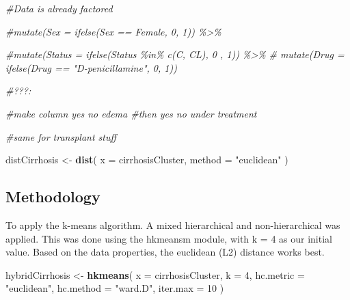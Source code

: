 \documentclass[
]{article}
\newenvironment{Shaded}{\begin{snugshade}}{\end{snugshade}}
\newcommand{\AttributeTok}[1]{\textcolor[rgb]{0.13,0.29,0.53}{#1}}
\newcommand{\CommentTok}[1]{\textcolor[rgb]{0.56,0.35,0.01}{\textit{#1}}}
\newcommand{\DecValTok}[1]{\textcolor[rgb]{0.00,0.00,0.81}{#1}}
\newcommand{\FunctionTok}[1]{\textcolor[rgb]{0.13,0.29,0.53}{\textbf{#1}}}
\newcommand{\NormalTok}[1]{#1}
\newcommand{\OtherTok}[1]{\textcolor[rgb]{0.56,0.35,0.01}{#1}}
\newcommand{\StringTok}[1]{\textcolor[rgb]{0.31,0.60,0.02}{#1}}
\begin{document}
\begin{Shaded}
\begin{Highlighting}[]
                                    
                          

\CommentTok{\#Data is already factored}
     
\CommentTok{\#mutate(Sex = ifelse(Sex == \textquotesingle{}Female\textquotesingle{}, 0, 1)) \%\textgreater{}\%}
  
   \CommentTok{\#mutate(Status = ifelse(Status \%in\% c(\textquotesingle{}C\textquotesingle{}, \textquotesingle{}CL\textquotesingle{}), 0 , 1)) \%\textgreater{}\%}
          \CommentTok{\#    mutate(Drug = ifelse(Drug == "D{-}penicillamine", 0, 1))}

  
\CommentTok{\#???:}
  
\CommentTok{\#make column yes no edema \#then yes no under treatment}

\CommentTok{\#same for transplant stuff}
\end{Highlighting}
\end{Shaded}

\begin{Shaded}
\begin{Highlighting}[]
\NormalTok{distCirrhosis }\OtherTok{\textless{}{-}} \FunctionTok{dist}\NormalTok{(}
  \AttributeTok{x =}\NormalTok{ cirrhosisCluster,}
  \AttributeTok{method =} \StringTok{"euclidean"}
\NormalTok{)}
\end{Highlighting}
\end{Shaded}

\hypertarget{methodology-2}{%
\subsection{Methodology}\label{methodology-2}}

To apply the k-means algorithm. A mixed hierarchical and
non-hierarchical was applied. This was done using the hkmeansm module,
with k = 4 as our initial value. Based on the data properties, the
euclidean (L2) distance works best.

\begin{Shaded}
\begin{Highlighting}[]
\NormalTok{hybridCirrhosis }\OtherTok{\textless{}{-}} \FunctionTok{hkmeans}\NormalTok{(}
  \AttributeTok{x =}\NormalTok{ cirrhosisCluster,}
  \AttributeTok{k =} \DecValTok{4}\NormalTok{,}
  \AttributeTok{hc.metric =} \StringTok{"euclidean"}\NormalTok{,}
  \AttributeTok{hc.method =} \StringTok{"ward.D"}\NormalTok{,}
  \AttributeTok{iter.max =} \DecValTok{10}
\NormalTok{)}
\end{Highlighting}
\end{Shaded}
\end{document}
